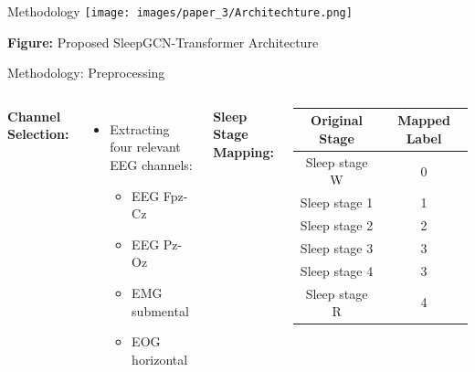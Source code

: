 \begin{frame}{Methodology}
    \centering
    \texttt{[image: images/paper\_3/Architechture.png]} %

        \small \textbf{Figure:} Proposed SleepGCN-Transformer Architecture %
\end{frame}

\begin{frame}{Methodology: Preprocessing}
    \begin{columns}
        \textbf{Channel Selection:}
        \begin{itemize}
            \item Extracting four relevant EEG channels:
            \begin{itemize}
                \item EEG Fpz-Cz
                \item EEG Pz-Oz
                \item EMG submental
                \item EOG horizontal
            \end{itemize}
        \end{itemize}

        \textbf{Sleep Stage Mapping:}
        \begin{table}[]
            \centering
            \renewcommand{\arraystretch}{1.2}
            \begin{tabular}{|c|c|}
                \hline
                \textbf{Original Stage} & \textbf{Mapped Label} \\
                \hline
                Sleep stage W  & 0 \\
                Sleep stage 1  & 1 \\
                Sleep stage 2  & 2 \\
                Sleep stage 3  & 3 \\
                Sleep stage 4  & 3 \\
                Sleep stage R  & 4 \\
                \hline
            \end{tabular}
        \end{table}
    \end{columns}
\end{frame}









